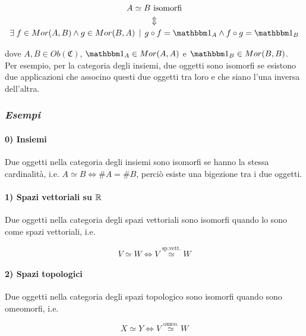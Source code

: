 \begin{gather}
	A \simeq B \text{ isomorfi} \nonumber \\
	\Updownarrow\\ %
	\E f \in Mor(A,B) \wedge g \in Mor(B,A) \, \mid \, g \circ f = \bigone_{A} \wedge f \circ g = \bigone_{B} \nonumber
\end{gather}

dove $ A,B \in Ob(\mathfrak{C}) $, $ \bigone_{A} \in Mor(A,A) $ e $ \bigone_{B} \in Mor(B,B) $.\\
Per esempio, per la categoria degli insiemi, due oggetti sono isomorfi se esistono due applicazioni che associno questi due oggetti tra loro e che siano l'una inversa dell'altra.

\subsubsection{\textit{Esempi}}

\paragraph{0) Insiemi}

Due oggetti nella categoria degli insiemi sono isomorfi se hanno la stessa cardinalità, i.e. $ A \simeq B \iff \# A = \# B $, perciò esiste una bigezione tra i due oggetti.

\paragraph{1) Spazi vettoriali su $ \mathbb{R} $}

Due oggetti nella categoria degli spazi vettoriali sono isomorfi quando lo sono come spazi vettoriali, i.e.

\begin{equation}
	V \simeq W \iff V \stackrel{\text{sp.vett.}}{\simeq} W
\end{equation}

\paragraph{2) Spazi topologici}

Due oggetti nella categoria degli spazi topologico sono isomorfi quando sono omeomorfi, i.e.

\begin{equation}
	X \simeq Y \iff V \stackrel{\text{omeo.}}{\simeq} W
\end{equation}

